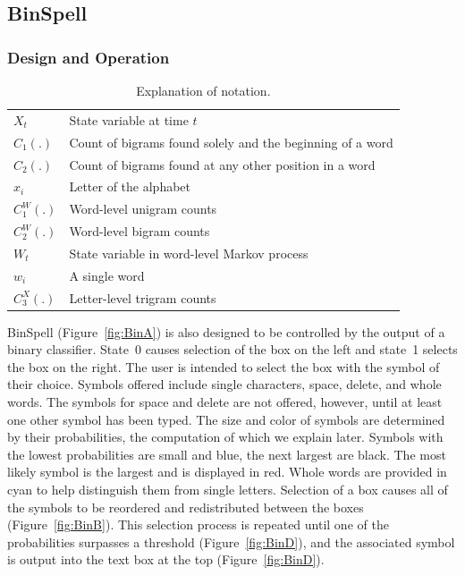 \documentclass[12pt,titlepage]{article}
\begin{document}
\subsection{BinSpell}

\subsubsection{Design and Operation}

\begin{table}
\caption{Explanation of notation.}
\begin{center}
\begin{tabular}{ll}
\hline\hline
$X_t$ & State variable at time $t$ \\
$C_1(.)$ & Count of bigrams found solely and the beginning of a word \\
$C_2(.)$ & Count of bigrams found at any other position in a word \\
$x_i$ & Letter of the alphabet \\
$C_1^W(.)$ & Word-level unigram counts \\
$C_2^W(.)$ & Word-level bigram counts \\
$W_t$ & State variable in word-level Markov process \\
$w_i$ & A single word \\
$C_3^X(.)$ & Letter-level trigram counts \\
\hline\hline
\end{tabular}
\end{center}
\label{table:Not}
\end{table}

BinSpell (Figure~\ref{fig:BinA}) is also designed to be controlled by the output of a binary classifier.  State~0 causes 
selection of the box on the left and state~1 selects the box on the right.  The user is intended to select the 
box with the symbol of their choice.  Symbols offered include single characters, space, delete, and 
whole words.  The symbols for space and delete are not offered, however, until at least one other 
symbol has been typed.  The size and color of symbols are determined by their probabilities, the 
computation of which we explain later.  Symbols with the lowest probabilities are small and blue, the 
next largest are black.  The most likely symbol is the largest and is displayed in red.  Whole words are 
provided in cyan to help distinguish them from single letters.  Selection of a box causes all of the 
symbols to be reordered and redistributed between the boxes (Figure~\ref{fig:BinB}).  This selection process is repeated 
until one of the probabilities surpasses a threshold (Figure~\ref{fig:BinD}), and the associated symbol is output into the text box 
at the top (Figure~\ref{fig:BinD}). 
\end{document}
